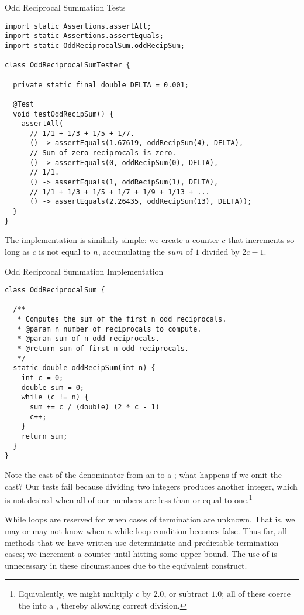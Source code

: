 \begin{cl}{Odd Reciprocal Summation Tests}
\begin{lstlisting}[language=MyJava]
import static Assertions.assertAll;
import static Assertions.assertEquals;
import static OddReciprocalSum.oddRecipSum;

class OddReciprocalSumTester {

  private static final double DELTA = 0.001;

  @Test
  void testOddRecipSum() {
    assertAll(
      // 1/1 + 1/3 + 1/5 + 1/7.
      () -> assertEquals(1.67619, oddRecipSum(4), DELTA),
      // Sum of zero reciprocals is zero.
      () -> assertEquals(0, oddRecipSum(0), DELTA),
      // 1/1.
      () -> assertEquals(1, oddRecipSum(1), DELTA),
      // 1/1 + 1/3 + 1/5 + 1/7 + 1/9 + 1/13 + ...
      () -> assertEquals(2.26435, oddRecipSum(13), DELTA));
  }
}
\end{lstlisting}
\end{cl}

The implementation is similarly simple: we create a counter $c$ that increments so long as $c$ is not equal to $n$, accumulating the $sum$ of $1$ divided by $2c-1$.

\begin{cl}{Odd Reciprocal Summation Implementation}
\begin{lstlisting}[language=MyJava]
class OddReciprocalSum {

  /**
   * Computes the sum of the first n odd reciprocals.
   * @param n number of reciprocals to compute.
   * @param sum of n odd reciprocals.
   * @return sum of first n odd reciprocals.
   */
  static double oddRecipSum(int n) {
    int c = 0;
    double sum = 0;
    while (c != n) {
      sum += c / (double) (2 * c - 1)
      c++;
    }
    return sum;
  }
}
\end{lstlisting}
\end{cl}

Note the cast of the denominator from an  to a ; what happens if we omit the cast? Our tests fail because dividing two integers produces another integer, which is not desired when all of our numbers are less than or equal to one.\footnote{Equivalently, we might multiply $c$ by $2.0$, or subtract $1.0$; all of these coerce the  into a , thereby allowing correct division.}

While loops are reserved for when cases of termination are unknown. That is, we may or may not know when a while loop condition becomes false. Thus far, all methods that we have written use deterministic and predictable termination cases; we increment a counter until hitting some upper-bound. The use of  is unnecessary in these circumstances due to the equivalent  construct.

